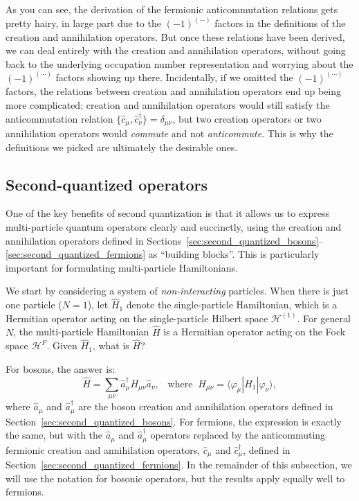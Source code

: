 \documentclass[pra,12pt]{revtex4}
\begin{document}
As you can see, the derivation of the fermionic anticommutation
relations gets pretty hairy, in large part due to the
$(-1)^{(\cdots)}$ factors in the definitions of the creation and
annihilation operators.  But once these relations have been derived,
we can deal entirely with the creation and annihilation operators,
without going back to the underlying occupation number representation
and worrying about the $(-1)^{(\cdots)}$ factors showing up there.
Incidentally, if we omitted the $(-1)^{(\cdots)}$ factors, the
relations between creation and annihilation operators end up being
more complicated: creation and annihilation operators would still
satisfy the anticommutation relation
$\{\hat{c}_\mu,\hat{c}_\nu^\dagger\}=\delta_{\mu\nu}$, but two
creation operators or two annihilation operators would
\textit{commute} and not \textit{anticommute}.  This is why the
definitions we picked are ultimately the desirable ones.

\subsection{Second-quantized operators}

One of the key benefits of second quantization is that it allows us to
express multi-particle quantum operators clearly and succinctly, using
the creation and annihilation operators defined in
Sections~\ref{sec:second_quantized_bosons}--\ref{sec:second_quantized_fermions}
as ``building blocks''.  This is particularly important for
formulating multi-particle Hamiltonians.

We start by considering a system of \textit{non-interacting}
particles.  When there is just one particle ($N=1$), let $\hat{H}_1$
denote the single-particle Hamiltonian, which is a Hermitian operator
acting on the single-particle Hilbert space $\mathscr{H}^{(1)}$.  For
general $N$, the multi-particle Hamiltonian $\hat{H}$ is a Hermitian
operator acting on the Fock space $\mathscr{H}^F$.  Given $\hat{H}_1$,
what is $\hat{H}$?

For bosons, the answer is:
$$\hat{H} = \sum_{\mu\nu} \hat{a}^\dagger_\mu H_{\mu\nu} \hat{a}_\nu, \;\;\; \mathrm{where}\;\; H_{\mu\nu} = \langle\varphi_\mu|\hat{H}_1|\varphi_\nu\rangle,$$
where $\hat{a}_\mu$ and $\hat{a}_\mu^\dagger$ are the boson creation
and annihilation operators defined in
Section~\ref{sec:second_quantized_bosons}.  For fermions, the
expression is exactly the same, but with the $\hat{a}_\mu$ and
$\hat{a}_\mu^\dagger$ operators replaced by the anticommuting
fermionic creation and annihilation operators, $\hat{c}_\mu$ and
$\hat{c}_\mu^\dagger$, defined in
Section~\ref{sec:second_quantized_fermions}.  In the remainder of this
subsection, we will use the notation for bosonic operators, but the
results apply equally well to fermions.
\end{document}
